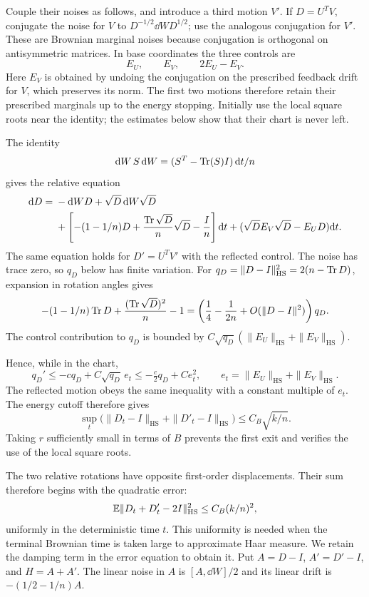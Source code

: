 Couple their noises as follows, and introduce a third motion $V'$.
If $D=U^TV$, conjugate the noise for $V$ to
$D^{-1/2}\dd W D^{1/2}$; use the analogous conjugation for $V'$.
These are Brownian marginal noises because conjugation is
orthogonal on antisymmetric matrices.  In base coordinates the
three controls are
\[
 E_U,\qquad E_V,\qquad 2E_U-E_V.
\]
Here $E_V$ is obtained by undoing the conjugation on the prescribed
feedback drift for $V$, which preserves its norm.  The first two
motions therefore retain their prescribed marginals up to the
energy stopping.  Initially use the local square roots near the
identity; the estimates below show that their chart is never left.

The identity
\[
 \mathrm d W\,S\,\mathrm d W=(S^T-\operatorname{Tr}(S)I)\,\mathrm d t/n
\]
gives the relative equation
\begin{align*}
 \mathrm d D={}&-\mathrm d W D+\sqrt D\,\mathrm d W\sqrt D\\
 &+\left[-(1-1/n)D+
             \frac{\operatorname{Tr}\sqrt D}{n}\sqrt D-\frac In\right]\mathrm d t
   +(\sqrt D E_V\sqrt D-E_UD)\mathrm d t.
\end{align*}
The same equation holds for $D'=U^TV'$ with the reflected control.
The noise has trace zero, so $q_D$ below has finite variation. For
$q_D=\|D-I\|_{\mathrm{HS}}^2
=2(n-\operatorname{Tr} D)$, expansion in rotation angles gives
\[
 -(1-1/n)\operatorname{Tr} D+\frac{(\operatorname{Tr}\sqrt D)^2}{n}-1
 =\left(\frac14-\frac1{2n}
       +O(\|D-I\|^2)\right)q_D.
\]
The control contribution to $q_D$ is bounded by
$C\sqrt{q_D}(\|E_U\|_{\mathrm{HS}}+\|E_V\|_{\mathrm{HS}})$.

Hence, while in the chart,
\[
 q_D'\le-cq_D+C\sqrt{q_D}\,e_t
       \le-\tfrac c2q_D+Ce_t^2,
 \qquad e_t=\|E_U\|_{\mathrm{HS}}+\|E_V\|_{\mathrm{HS}}.
\]
The reflected motion obeys the same inequality with a constant
multiple of $e_t$.  The energy cutoff therefore gives
\begin{equation}\label{prof:eq:relative-radius}
 \sup_t\bigl(\|D_t-I\|_{\mathrm{HS}}
             +\|D'_t-I\|_{\mathrm{HS}}\bigr)
 \le C_B\sqrt{k/n}.
\end{equation}
Taking $r$ sufficiently small in terms of $B$ prevents the first
exit and verifies the use of the local square roots.

The two relative rotations have opposite first-order displacements.
Their sum therefore begins with the quadratic error:
\begin{equation}\label{prof:eq:reflection-error}
 \mathbb E\|D_t+D'_t-2I\|_{\mathrm{HS}}^2\le C_B(k/n)^2,
\end{equation}
uniformly in the deterministic time $t$. This uniformity is needed
when the terminal Brownian time is taken large to approximate Haar
measure. We retain the damping term in the error equation to obtain it.  Put $A=D-I$, $A'=D'-I$, and
$H=A+A'$.  The linear noise in $A$ is $[A,\dd W]/2$ and its linear
drift is $-(1/2-1/n)A$.

